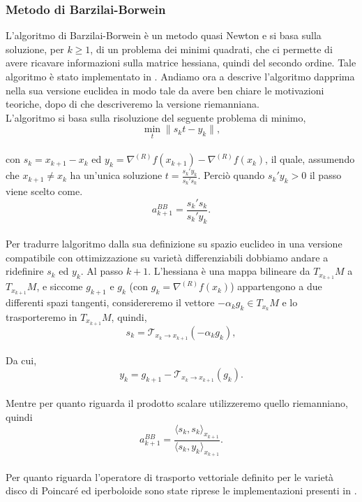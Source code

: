 \documentclass[a4paper, 12pt]{article}
\begin{document}
\subsubsection{Metodo di Barzilai-Borwein}
L'algoritmo di Barzilai-Borwein è un metodo quasi Newton e si basa sulla soluzione, per $k \geq 1$, di un problema dei minimi quadrati, che ci permette di avere ricavare informazioni sulla matrice hessiana, quindi del secondo ordine. Tale algoritmo è stato implementato in \cite{Iannazzo}. Andiamo ora a descrive l'algoritmo dapprima nella sua versione euclidea in modo tale da avere ben chiare le motivazioni teoriche, dopo di che descriveremo la versione riemanniana.\\
L'algoritmo si basa sulla risoluzione del seguente problema di minimo,\\
\[\min_{t} \| s_kt - y_k \|,\]\\
con $s_k = x_{k+1} - x_k$ ed $y_k = \nabla^{(R)} f(x_{k+1}) - \nabla^{(R)} f(x_k)$, il quale, assumendo che $x_{k+1} \neq x_k$ ha un'unica soluzione $t = \frac{s_k'y_k}{s_k's_k}$. Perciò quando $s_k'y_k > 0$ il passo viene scelto come.\\
\[a_{k+1}^{BB} = \frac{s_k's_k}{s_k'y_k}.\]\\
Per tradurre lalgoritmo dalla sua definizione su spazio euclideo in una versione compatibile con ottimizzazione su varietà differenziabili dobbiamo andare a ridefinire $s_k$ ed $y_k$. Al passo $k+1$. L'hessiana è una mappa bilineare da $T_{x_{k+1}}M$ a $T_{x_{k+1}}M$, e siccome $g_{k+1}$ e $g_{k}$ (con $g_k = \nabla^{(R)} f(x_k)$) appartengono a due differenti spazi tangenti, considereremo il vettore $-\alpha_kg_k \in T_{x_k}M$ e lo trasporteremo in $T_{x_{k+1}}M$, quindi,\\
\[s_k = \mathcal{T}_{x_k \to x_{k+1}}(-\alpha_kg_k),\]\\
Da cui,\\
\[y_k = g_{k+1} - \mathcal{T}_{x_k \to x_{k+1}}(g_k).\]\\
Mentre per quanto riguarda il prodotto scalare utilizzeremo quello riemanniano, quindi\\
\[a_{k+1}^{BB} = \frac{\langle s_k,s_k \rangle_{x_{k+1}}}{\langle s_k,y_k \rangle_{x_{k+1}}}.\]\\
Per quanto riguarda l'operatore di trasporto vettoriale definito per le varietà disco di Poincaré ed iperboloide sono state riprese le implementazioni presenti in \cite{ManOpt}.
\end{document}
